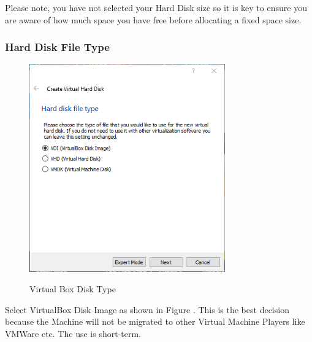 Please note, you have not selected your Hard Disk size so it is key to ensure
you are aware of how much space you have free before allocating a fixed space size.

\subsubsection{Hard Disk File Type}
\begin{figure}[!htb]
    \centering
    \includegraphics[width=0.752\textwidth]{images/Win00-04.png}\\[0cm]  
    \caption[Windows Virtual Box]{Virtual Box Disk Type}
    \label{fig:00-04 - Windows Virtual Box Disk Type} 
\end{figure}
Select VirtualBox Disk Image as shown in Figure .
This is the best decision because the Machine will not be migrated to other
Virtual Machine Players like VMWare etc. The use is short-term.

